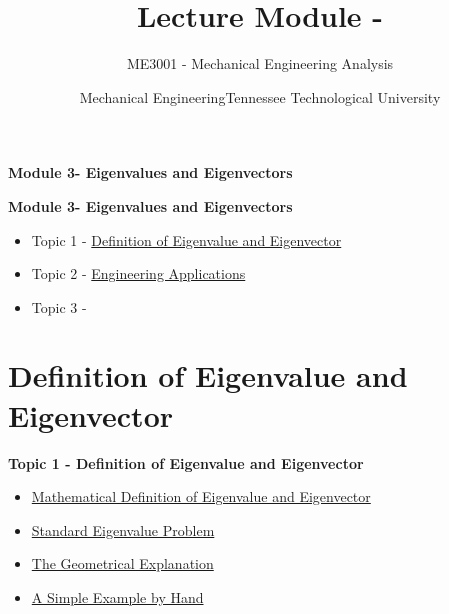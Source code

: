 \documentclass[fleqn]{ltx-talk} %
\author{ME3001 - Mechanical Engineering Analysis}
\title{Lecture Module - \moduletitle}
\date{Mechanical Engineering\vspc Tennessee Technological University}
\newcommand{\MNUM}{3\hspace{2mm}} %
\newcommand{\moduletitle}{Eigenvalues and Eigenvectors}
\newcommand{\sectionItitle}{Definition of Eigenvalue and Eigenvector}
\newcommand{\sectionIItitle}{Engineering Applications}
\newcommand{\sectionIIItitle}{}
\newcommand{\sectionIsubsectionItitle}{Mathematical Definition of Eigenvalue and Eigenvector}
\newcommand{\sectionIsubsectionIItitle}{Standard Eigenvalue Problem}
\newcommand{\sectionIsubsectionIIItitle}{The Geometrical Explanation}
\newcommand{\sectionIsubsectionIVtitle}{A Simple Example by Hand}
\begin{document}
	\lstset{language=MATLAB,basicstyle=\ttfamily\small,showstringspaces=false}

	\begin{frame}
    \begin{framed}\Large \textbf{Module \MNUM - \moduletitle}\end{framed} 
  \end{frame}

	\begin{frame} 
		\large \textbf{Module \MNUM - \moduletitle} \vspace{3mm}\\

		\begin{itemize}
			\item Topic 1 - \hyperref[sectionI]{\sectionItitle} \vspc %
			\item Topic 2 - \hyperref[sectionII]{\sectionIItitle} \vspc %
			\item Topic 3 - \hyperref[sectionIII]{\sectionIIItitle} \vspc %
		\end{itemize}

	\end{frame}

	\section{\sectionItitle}\label{sectionI}

		\begin{frame} 
			\large \textbf{Topic 1 - \sectionItitle} \vspace{3mm}\\

			\begin{itemize}
				\item \hyperref[sectionIsubsectionI]{\sectionIsubsectionItitle} \vspc %
				\item \hyperref[sectionIsubsectionII]{\sectionIsubsectionIItitle} \vspc %
				\item \hyperref[sectionIsubsectionIII]{\sectionIsubsectionIIItitle} \vspc %
				\item \hyperref[sectionIsubsectionIV]{\sectionIsubsectionIVtitle} \vspc %
			\end{itemize}
		\end{frame}
		
\end{document}
